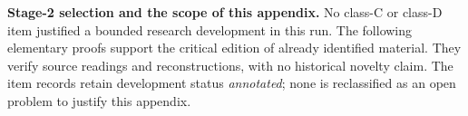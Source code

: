 \noindent\textbf{Stage-2 selection and the scope of this appendix.}
No class-C or class-D item justified a bounded research development in this run.
The following elementary proofs support the critical edition of already identified
material. They verify source readings and reconstructions, with no historical
novelty claim. The item records retain development status \textit{annotated};
none is reclassified as an open problem to justify this appendix.

